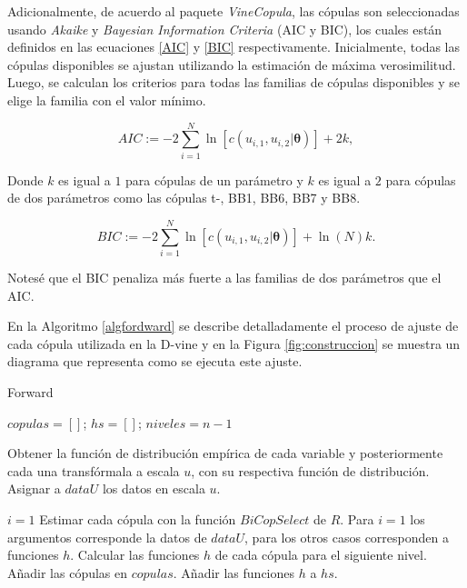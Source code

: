 Adicionalmente, de acuerdo al paquete \textit{VineCopula}, las cópulas son seleccionadas usando \textit{Akaike} y \textit{Bayesian Information Criteria} (AIC y BIC), los cuales están definidos en las ecuaciones \ref{AIC} y \ref{BIC} respectivamente. Inicialmente, todas las cópulas disponibles se ajustan utilizando la estimación de máxima verosimilitud. Luego, se calculan los criterios para todas las familias de cópulas disponibles y se elige la familia con el valor mínimo.

\begin{equation}\label{AIC}
    AIC := -2 \sum_{i=1}^N \ln[c(u_{i,1},u_{i,2}|\boldsymbol{\theta})] + 2k,
\end{equation}

Donde $k$ es igual a $1$ para cópulas de un parámetro y $k$ es igual a $2$ para cópulas de dos parámetros como las cópulas t-, BB1, BB6, BB7 y BB8.

\begin{equation}\label{BIC}
    BIC := -2 \sum_{i=1}^N \ln[c(u_{i,1},u_{i,2}|\boldsymbol{\theta})] + \ln(N)k.
\end{equation}

Notesé que el BIC penaliza más fuerte a las familias de dos parámetros que el AIC.

En la Algoritmo \ref{algfordward} se describe detalladamente el proceso de ajuste de cada cópula utilizada en la D-vine y en la Figura \ref{fig:construccion} se muestra un diagrama que representa como se ejecuta este ajuste.

\begin{algorithm}[H]
      \caption{Forward}
      \label{algfordward}
      \begin{algorithmic}[1]  

        \State $copulas =  \left [  \right ]$; $hs =  \left [  \right ]$; $niveles = n-1$
        
        \State Obtener la función de distribución empírica de cada variable y posteriormente cada una transfórmala a escala $u$, con su respectiva función de distribución. 
        \State Asignar a $dataU$ los datos en escala $u$.
        
        \State $i = 1$
          \State Estimar cada cópula con la función $BiCopSelect$ de $R$. Para $i = 1$ los argumentos corresponde la datos de $dataU$, para los otros casos corresponden a funciones $h$.
          \State Calcular las funciones $h$ de cada cópula para el siguiente nivel.
          \State Añadir las cópulas en $copulas$.
          \State Añadir las funciones $h$ a $hs$.
        \EndWhile
       
      \end{algorithmic}
    \end{algorithm}




